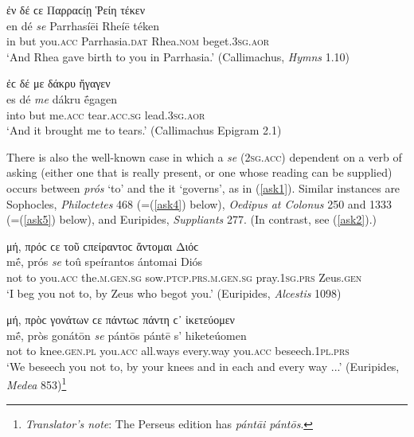 \begin{exe}
\ex ἐν δέ ϲε Παρραϲίῃ Ῥείη τέκεν\\
\gll en dé \emph{se} Parrhasíēi Rheíē téken\\
in but you.\textsc{acc} Parrhasia.\textsc{dat} Rhea.\textsc{nom} beget.\textsc{3sg.aor}\\
\trans `And Rhea gave birth to you in Parrhasia.' (Callimachus, \textit{Hymns} 1.10)
\label{preppron5}
\end{exe}

\begin{exe}
\ex ἐϲ δέ με δάκρυ ἤγαγεν\\
\gll es dé \emph{me} dákru ḗgagen\\
into but me.\textsc{acc} tear.\textsc{acc.sg} lead.\textsc{3sg.aor}\\
\trans `And it brought me to tears.' (Callimachus Epigram 2.1)
\label{preppron6}
\end{exe}

There is also the well-known case in which a \textit{se} (\textsc{2sg.acc}) dependent on a verb of asking (either one that is really present, or one whose reading can be supplied) occurs between \textit{prós} `to' and the  it `governs', as in (\ref{ask1}). Similar instances are Sophocles, \textit{Philoctetes} 468 (=(\ref{ask4}) below), \textit{Oedipus at Colonus} 250 and 1333 (=(\ref{ask5}) below), and Euripides, \textit{Suppliants} 277. (In contrast, see (\ref{ask2}).) 

\begin{exe}
\ex μή, πρόϲ ϲε τοῦ ϲπείραντοϲ ἄντομαι Διόϲ\\
\gll mḗ, prós \emph{se} toû speírantos ántomai Diós\\
not to you.\textsc{acc} the.\textsc{m.gen.sg} sow.\textsc{ptcp.prs.m.gen.sg} pray.\textsc{1sg.prs} Zeus.\textsc{gen}\\
\trans `I beg you not to, by Zeus who begot you.' (Euripides, \textit{Alcestis} 1098)
\label{ask1}
\end{exe}

\begin{exe}
\ex μή, πρὸϲ γονάτων ϲε πάντωϲ πάντη ϲ᾽ ἱκετεύομεν\\
\gll mḗ, pròs gonátōn \emph{se} pántōs pántē s' hiketeúomen\\
not to knee.\textsc{gen.pl} you.\textsc{acc} all.ways every.way
you.\textsc{acc} beseech\textsc{.1pl.prs}\\
\trans `We beseech you not to, by your knees and in each and every way ...' (Euripides, \textit{Medea} 853)\footnote{\emph{Translator's note}: The Perseus edition has \textit{pántāi pántōs}.}
\label{ask2}
\end{exe}

